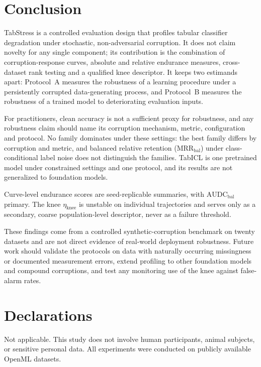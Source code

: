 \documentclass[pdflatex,sn-mathphys]{sn-jnl}
\theoremstyle{thmstyleone}
\theoremstyle{thmstyletwo}
\theoremstyle{thmstylethree}
\newcommand{\AUDC}{\mathrm{AUDC}}
\newcommand{\MRR}{\mathrm{MRR}}
\newcommand{\etaknee}{\eta_{\mathrm{knee}}}
\begin{document}
\section{Conclusion}\label{sec:conclusion}

TabStress is a controlled evaluation design that profiles tabular classifier degradation under stochastic, non-adversarial corruption. It does not claim novelty for any single component; its contribution is the combination of corruption-response curves, absolute and relative endurance measures, cross-dataset rank testing and a qualified knee descriptor. It keeps two estimands apart: Protocol~A measures the robustness of a learning procedure under a persistently corrupted data-generating process, and Protocol~B measures the robustness of a trained model to deteriorating evaluation inputs.

For practitioners, clean accuracy is not a sufficient proxy for robustness, and any robustness claim should name its corruption mechanism, metric, configuration and protocol. No family dominates under these settings: the best family differs by corruption and metric, and balanced relative retention ($\MRR_{\mathrm{bal}}$) under class-conditional label noise does not distinguish the families. TabICL is one pretrained model under constrained settings and one protocol, and its results are not generalized to foundation models.

Curve-level endurance scores are seed-replicable summaries, with $\AUDC_{\mathrm{bal}}$ primary. The knee $\etaknee$ is unstable on individual trajectories and serves only as a secondary, coarse population-level descriptor, never as a failure threshold.

These findings come from a controlled synthetic-corruption benchmark on twenty datasets and are not direct evidence of real-world deployment robustness. Future work should validate the protocols on data with naturally occurring missingness or documented measurement errors, extend profiling to other foundation models and compound corruptions, and test any monitoring use of the knee against false-alarm rates.


\backmatter

\section*{Declarations}\label{sec:declarations}

Not applicable. This study does not involve human participants, animal subjects, or sensitive personal data. All experiments were conducted on publicly available OpenML datasets.
\end{document}

